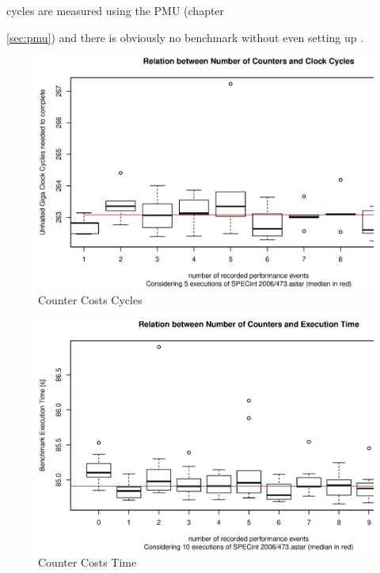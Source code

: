 cycles are measured using the PMU (chapter {\ref{sec:pmu}) and \JWTlibpfm{}
there is obviously no benchmark without even setting up \JWTlibpfm{}.

\begin{figure}
  \centering
    \includegraphics[width=\textwidth]{fig/ctr-csts-cycles.eps}
  \caption{Counter Costs Cycles}
  \label{fig:ctr-costs-cycles}
\end{figure}

\begin{figure}
  \centering
    \includegraphics[width=\textwidth]{fig/ctr-csts-time.eps}
  \caption{Counter Costs Time}
  \label{fig:ctr-costs-time}
\end{figure}

}
